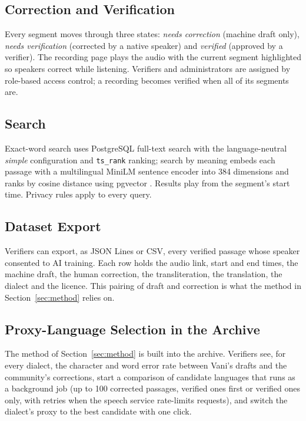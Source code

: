 \documentclass[conference]{IEEEtran}
\begin{document}
\subsection{Correction and Verification}
Every segment moves through three states: \emph{needs correction} (machine draft only), \emph{needs verification} (corrected by a native speaker) and \emph{verified} (approved by a verifier). The recording page plays the audio with the current segment highlighted so speakers correct while listening. Verifiers and administrators are assigned by role-based access control; a recording becomes verified when all of its segments are.

\subsection{Search}
Exact-word search uses PostgreSQL full-text search with the language-neutral \emph{simple} configuration and \texttt{ts\_rank} ranking; search by meaning embeds each passage with a multilingual MiniLM sentence encoder \cite{reimers2019,reimers2020} into 384 dimensions and ranks by cosine distance using pgvector \cite{pgvector}. Results play from the segment's start time. Privacy rules apply to every query.

\subsection{Dataset Export}
Verifiers can export, as JSON Lines or CSV, every verified passage whose speaker consented to AI training. Each row holds the audio link, start and end times, the machine draft, the human correction, the transliteration, the translation, the dialect and the licence. This pairing of draft and correction is what the method in Section~\ref{sec:method} relies on.

\subsection{Proxy-Language Selection in the Archive}
The method of Section~\ref{sec:method} is built into the archive. Verifiers see, for every dialect, the character and word error rate between Vani's drafts and the community's corrections, start a comparison of candidate languages that runs as a background job (up to 100 corrected passages, verified ones first or verified ones only, with retries when the speech service rate-limits requests), and switch the dialect's proxy to the best candidate with one click.
\end{document}
